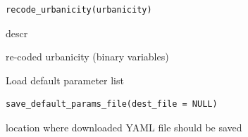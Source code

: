 \documentclass[a4paper]{book}
\begin{document}
%
\begin{Usage}
\begin{verbatim}
recode_urbanicity(urbanicity)
\end{verbatim}
\end{Usage}
%
\begin{Arguments}
\begin{ldescription}
\item[\code{urbanicity}] descr
\end{ldescription}
\end{Arguments}
%
\begin{Value}
re-coded urbanicity (binary variables)
\end{Value}
%
\begin{Description}
Load default parameter list
\end{Description}
%
\begin{Usage}
\begin{verbatim}
save_default_params_file(dest_file = NULL)
\end{verbatim}
\end{Usage}
%
\begin{Arguments}
\begin{ldescription}
\item[\code{dest\_file}] location where downloaded YAML file should be saved
\end{ldescription}
\end{Arguments}
\printindex{}
\end{document}
